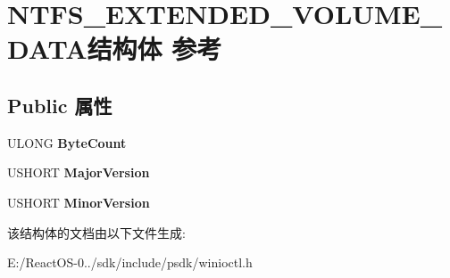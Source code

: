 \hypertarget{struct_n_t_f_s___e_x_t_e_n_d_e_d___v_o_l_u_m_e___d_a_t_a}{}\section{N\+T\+F\+S\+\_\+\+E\+X\+T\+E\+N\+D\+E\+D\+\_\+\+V\+O\+L\+U\+M\+E\+\_\+\+D\+A\+T\+A结构体 参考}
\label{struct_n_t_f_s___e_x_t_e_n_d_e_d___v_o_l_u_m_e___d_a_t_a}
\subsection*{Public 属性}
\begin{DoxyCompactItemize}
\item 
\mbox{\label{struct_n_t_f_s___e_x_t_e_n_d_e_d___v_o_l_u_m_e___d_a_t_a_a7f97452b7d26f53daa4eb7d87b37696b}} 
U\+L\+O\+NG {\bfseries Byte\+Count}
\item 
\mbox{\label{struct_n_t_f_s___e_x_t_e_n_d_e_d___v_o_l_u_m_e___d_a_t_a_a59b924cc0cf62eaf37b1320f02416b94}} 
U\+S\+H\+O\+RT {\bfseries Major\+Version}
\item 
\mbox{\label{struct_n_t_f_s___e_x_t_e_n_d_e_d___v_o_l_u_m_e___d_a_t_a_a2b83e70714733957a06a22cd3a1cbf85}} 
U\+S\+H\+O\+RT {\bfseries Minor\+Version}
\end{DoxyCompactItemize}


该结构体的文档由以下文件生成\+:\begin{DoxyCompactItemize}
\item 
E\+:/\+React\+O\+S-\/0../sdk/include/psdk/winioctl.\+h\end{DoxyCompactItemize}

